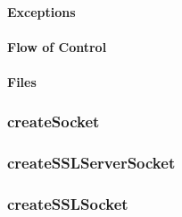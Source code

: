 \paragraph{Exceptions}
\begin{itemize}
\end{itemize}

\paragraph{Flow of Control}
\begin{itemize}
\end{itemize}

\paragraph{Files}
\begin{itemize}
\end{itemize}

\subsubsection{createSocket}

\subsubsection{createSSLServerSocket}

\subsubsection{createSSLSocket}

